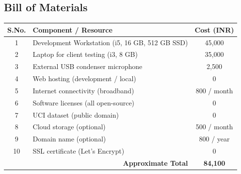 \documentclass[oneside,a4paper,12pt]{report}
\begin{document}
\begin{appendices}
\chapter{Bill of Materials}
\begin{table}[H]
\centering
\def\arraystretch{1.25}
\begin{tabularx}{\textwidth}{|c|X|c|}
\hline
\textbf{S.No.} & \textbf{Component / Resource} & \textbf{Cost (INR)} \\ \hline
1 & Development Workstation (i5, 16 GB, 512 GB SSD) & 45,000 \\ \hline
2 & Laptop for client testing (i3, 8 GB) & 35,000 \\ \hline
3 & External USB condenser microphone & 2,500 \\ \hline
4 & Web hosting (development / local) & 0 \\ \hline
5 & Internet connectivity (broadband) & 800 / month \\ \hline
6 & Software licenses (all open-source) & 0 \\ \hline
7 & UCI dataset (public domain) & 0 \\ \hline
8 & Cloud storage (optional) & 500 / month \\ \hline
9 & Domain name (optional) & 800 / year \\ \hline
10 & SSL certificate (Let's Encrypt) & 0 \\ \hline
\multicolumn{2}{|r|}{\textbf{Approximate Total}} & \textbf{84,100} \\ \hline
\end{tabularx}
\end{table}


\end{appendices}
\end{document}
